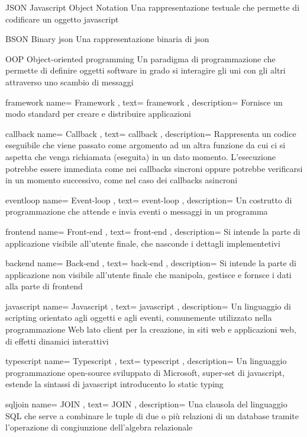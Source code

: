 {JSON}
{Javascript Object Notation}
{Una rappresentazione testuale che permette di codificare un oggetto \gls{javascript}}


{BSON}
{Binary \acrshort{json}}
{Una rappresentazione binaria di \gls{json}}


{OOP}
{Object-oriented programming}
{Un paradigma di programmazione che permette di definire oggetti software in grado si interagire gli uni con gli altri attraverso uno scambio di messaggi}

\newglossaryentry
{framework}
{
	name={
		Framework
	},
	text={
		framework
	},
	description={
		Fornisce un modo standard per creare e distribuire applicazioni
	}
}

\newglossaryentry
{callback}
{
	name={
		Callback
	},
	text={
		callback
	},
	description={
		Rappresenta un codice eseguibile che viene passato come argomento ad un altra funzione da cui ci si aspetta che venga richiamata (eseguita) in un dato momento. L'esecuzione potrebbe essere immediata come nei callbacks sincroni oppure potrebbe verificarsi in un momento successivo, come nel caso dei callbacks asincroni
	}
}

\newglossaryentry
{eventloop}
{
	name={
		Event-loop
	},
	text={
		event-loop
	},
	description={
		Un costrutto di programmazione che attende e invia eventi o messaggi in un programma
	}
}

\newglossaryentry
{frontend}
{
	name={
		Front-end
	},
	text={
		front-end
	},
	description={
		Si intende la parte di applicazione visibile all'utente finale, che nasconde i dettagli implementetivi
	}
}

\newglossaryentry
{backend}
{
	name={
		Back-end
	},
	text={
		back-end
	},
	description={
		Si intende la parte di applicazione non visibile all'utente finale che manipola, gestisce e fornsce i dati alla parte di \gls{frontend}
	}
}

\newglossaryentry
{javascript}
{
	name={
		Javascript
	},
	text={
		javascript
	},
	description={
		Un linguaggio di scripting orientato agli oggetti e agli eventi, comunemente utilizzato nella programmazione Web lato client per la creazione, in siti web e applicazioni web, di effetti dinamici interattivi
	}
}

\newglossaryentry
{typescript}
{
	name={
		Typescript
	},
	text={
		typescript
	},
	description={
		Un linguaggio programmazione open-source sviluppato di Microsoft, super-set di \gls{javascript}, estende la sintassi di \gls{javascript} introducento lo static typing
	}
}

\newglossaryentry
{sqljoin}
{
name={
	JOIN
},
text={
	JOIN
},
description={
	Una clausola del linguaggio SQL che serve a combinare le tuple di due o più relazioni di un database tramite l'operazione di congiunzione dell'algebra relazionale
}
}